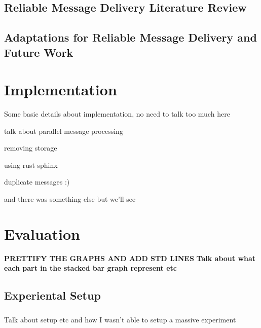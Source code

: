 \documentclass[a4paper,11pt,oneside]{report}
\begin{document}
\section{Reliable Message Delivery Literature Review}

\section{Adaptations for Reliable Message Delivery and Future Work}

\chapter{Implementation}



Some basic details about implementation, no need to talk too much here

talk about parallel message processing

removing storage

using rust sphinx

duplicate messages :)

and there was something else but we'll see

\chapter{Evaluation}



\textbf{PRETTIFY THE GRAPHS AND ADD STD LINES}
\textbf{Talk about what each part in the stacked bar graph represent etc}
\section{Experiental Setup}
\subsection{}
Talk about setup etc and how I wasn't able to setup a massive experiment
\end{document}
